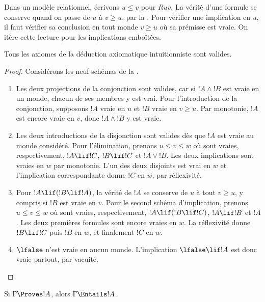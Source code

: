 \documentclass[../../../include/open-logic-section]{subfiles}
\begin{document}


Dans un modèle relationnel, écrivons $u\leq v$ pour $Ruv$.
La vérité d'une formule se conserve quand on passe de $u$ à
$v\geq u$, par la .
Pour vérifier une implication en $u$, il faut vérifier sa
conclusion en tout monde $v\geq u$ où sa prémisse est vraie.
On itère cette lecture pour les implications emboîtées.

\begin{lem}
Tous les axiomes de la déduction axiomatique intuitionniste
sont valides.
\end{lem}

\begin{proof}
Considérons les neuf schémas de la .
\begin{enumerate}
\item Les deux projections de la conjonction sont valides,
  car si $!A\land !B$ est vraie en un monde, chacun de ses
  membres y est vrai. Pour l'introduction de la conjonction,
  supposons $!A$ vraie en $u$ et $!B$ vraie en $v\geq u$.
  Par monotonie, $!A$ est encore vraie en $v$, donc
  $!A\land !B$ y est vraie.
\item Les deux introductions de la disjonction sont valides
  dès que $!A$ est vraie au monde considéré. Pour l'élimination,
  prenons $u\leq v\leq w$ où sont vraies, respectivement,
  $!A\lif !C$, $!B\lif !C$ et $!A\lor !B$.
  Les deux implications sont vraies en $w$ par monotonie.
  L'un des deux disjoints est vrai en $w$ et l'implication
  correspondante donne $!C$ en $w$, par réflexivité.
\item Pour $!A\lif(!B\lif !A)$, la vérité de $!A$ se
  conserve de $u$ à tout $v\geq u$, y compris si $!B$
  est vraie en $v$. Pour le second schéma d'implication,
  prenons $u\leq v\leq w$ où sont vraies, respectivement,
  $!A\lif(!B\lif !C)$, $!A\lif !B$ et $!A$.
  Les deux premières formules sont encore vraies en $w$.
  La réflexivité donne $!B\lif !C$ puis $!B$ en $w$,
  et finalement $!C$ en $w$.
\item $\lfalse$ n'est vraie en aucun monde. L'implication
  $\lfalse\lif !A$ est donc vraie partout, par vacuité.
\end{enumerate}
\end{proof}

\begin{thm}[Correction]
  Si $\Gamma \Proves !A$, alors $ \Gamma \Entails !A$.
\end{thm}
\end{document}
